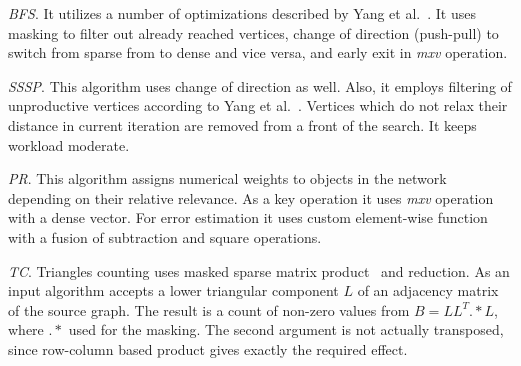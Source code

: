 \textit{BFS}. It utilizes a number of optimizations described by Yang et al.~\cite{https://doi.org/10.48550/arxiv.1804.03327:pushpull}. It uses masking to filter out already reached vertices, change of direction (push-pull) to switch from sparse from to dense and vice versa, and early exit in \textit{mxv} operation.

\textit{SSSP}. This algorithm uses change of direction as well. Also, it employs filtering of unproductive vertices according to Yang et al.~\cite{yang2019graphblast}. Vertices which do not relax their distance in current iteration are removed from a front of the search. It keeps workload moderate. 

\textit{PR}. This algorithm assigns numerical weights to objects in the network depending on their relative relevance. As a key operation it uses \textit{mxv} operation with a dense vector. For error estimation it uses custom element-wise function with a fusion of subtraction and square operations.  

\textit{TC}. Triangles counting uses masked sparse matrix product~\cite{yang2019graphblast} and reduction. As an input algorithm accepts a lower triangular component $L$ of an adjacency matrix of the source graph. The result is a count of non-zero values from $B = LL^T .* L$, where $.*$ used for the masking. The second argument is not actually transposed, since row-column based product gives exactly the required effect.